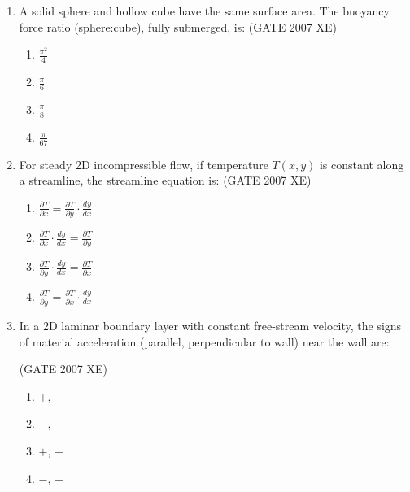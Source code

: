 \documentclass[journal,cmex10]{IEEEtran}
\theoremstyle{remark}
\numberwithin{equation}{enumi}
\numberwithin{figure}{enumi}
\begin{document}
\begin{enumerate}
\item A solid sphere and hollow cube have the same surface area. The buoyancy force ratio (sphere:cube), fully submerged, is:  
\hfill{(GATE 2007 XE)}
\begin{multicols}{4}
\begin{enumerate}
    \item $\frac{\pi^2}{4}$
    \item $\frac{\pi}{6}$
    \item $\frac{\pi}{8}$
    \item $\frac{\pi}{67}$
\end{enumerate}
\end{multicols}

\item For steady 2D incompressible flow, if temperature $T(x,y)$ is constant along a streamline, the streamline equation is:  
\hfill{(GATE 2007 XE)}
\begin{multicols}{4}
\begin{enumerate}
    \item $\frac{\partial T}{\partial x} = \frac{\partial T}{\partial y} \cdot \frac{dy}{dx}$
    \item $\frac{\partial T}{\partial x} \cdot \frac{dy}{dx} = \frac{\partial T}{\partial y}$
    \item $\frac{\partial T}{\partial y} \cdot \frac{dy}{dx} = \frac{\partial T}{\partial x}$
    \item $\frac{\partial T}{\partial y} = \frac{\partial T}{\partial x} \cdot \frac{dy}{dx}$
\end{enumerate}
\end{multicols}

\item In a 2D laminar boundary layer with constant free-stream velocity, the signs of material acceleration (parallel, perpendicular to wall) near the wall are:

\hfill{(GATE 2007 XE)}
\begin{multicols}{4}
\begin{enumerate}
    \item $+$, $-$
    \item $-$, $+$
    \item $+$, $+$
    \item $-$, $-$
\end{enumerate}
\end{multicols}


\end{enumerate}
\end{document}
